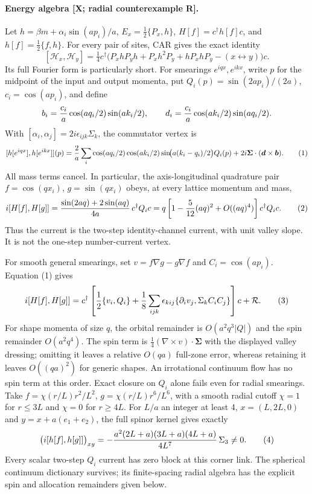 \paragraph{Energy algebra [X; radial counterexample R].}
Let $h=\beta m+\alpha_i\sin(ap_i)/a$, $E_x=\tfrac12\{P_x,h\}$,
$H[f]=c^\dagger h[f]c$, and $h[f]=\tfrac12\{f,h\}$.
For every pair of sites, CAR gives the exact identity
\[
 [\mathcal H_x,\mathcal H_y]
 =\tfrac14 c^\dagger\bigl(P_xhP_yh+P_xh^2P_y+hP_xhP_y
                         -(x\leftrightarrow y)\bigr)c .
\]
Its full Fourier form is particularly short.  For smearings $e^{iqx},e^{ikx}$,
write $p$ for the midpoint of the input and output momenta, put
$Q_i(p)=\sin(2ap_i)/(2a)$, $c_i=\cos(ap_i)$, and define
\[
 b_i={c_i\over a}\cos(aq_i/2)\sin(ak_i/2),\qquad
 d_i={c_i\over a}\cos(ak_i/2)\sin(aq_i/2).
\]
With $[\alpha_i,\alpha_j]=2i\epsilon_{ijk}\Sigma_k$, the commutator vertex is
\[
 [h[e^{iqx}],h[e^{ikx}]](p)
 ={2\over a}\sum_i\cos(aq_i/2)\cos(ak_i/2)
       \sin\!\bigl(a(k_i-q_i)/2\bigr)Q_i(p)
   +2i\boldsymbol\Sigma\cdot(\boldsymbol d\mathbin\times\boldsymbol b).
 \tag{1}
\]
All mass terms cancel.  In particular, the axis-longitudinal quadrature pair
$f=\cos(qx_i)$, $g=\sin(qx_i)$ obeys, at every lattice momentum and mass,
\[
 i[H[f],H[g]]={\sin(2aq)+2\sin(aq)\over4a}\,c^\dagger Q_i c
 =q\left[1-{5\over12}(aq)^2+O((aq)^4)\right]c^\dagger Q_i c . \tag{2}
\]
Thus the current is the two-step identity-channel current, with unit valley
slope.  It is not the one-step number-current vertex.

For smooth general smearings, set $v=f\nabla g-g\nabla f$ and
$C_i=\cos(ap_i)$.  Equation (1) gives
\[
 i[H[f],H[g]]=c^\dagger\left[
 {1\over2}\{v_i,Q_i\}
 +{1\over8}\sum_{ijk}\epsilon_{kij}
     \{\partial_i v_j,\Sigma_k C_iC_j\}\right]c+\mathcal R . \tag{3}
\]
For shape momenta of size $q$, the orbital remainder is
$O(a^2q^3|Q|)$ and the spin remainder $O(a^2q^4)$.
The spin term is $\tfrac14(\nabla\times v)\cdot\boldsymbol\Sigma$ with
the displayed valley dressing; omitting it leaves a relative $O(qa)$
full-zone error, whereas retaining it leaves $O((qa)^2)$ for generic shapes.
An irrotational continuum flow has no spin term at this order.
Exact closure on $Q_i$ alone fails even for radial smearings. Take
$f=\chi(r/L)r^2/L^2$, $g=\chi(r/L)r^6/L^6$, with a smooth radial cutoff
$\chi=1$ for $r\leq3L$ and $\chi=0$ for $r\geq4L$.
For $L/a$ an integer at least 4, $x=(L,2L,0)$ and
$y=x+a(e_1+e_2)$, the full spinor kernel gives exactly
\[
 \bigl(i[h[f],h[g]]\bigr)_{xy}
 =-{a^2(2L+a)(3L+a)(4L+a)\over4L^7}\,\Sigma_3\ne0. \tag{4}
\]
Every scalar two-step $Q_i$ current has zero block at this corner link.
The spherical continuum dictionary survives; its finite-spacing radial
algebra has the explicit spin and allocation remainders given below.

